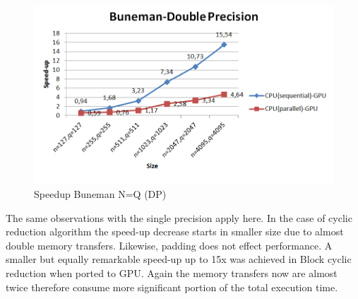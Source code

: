 \begin{figure}[H]
   \centering
       \includegraphics[width=1\textwidth]{grafhmata/buneman_dp_speedup_nq.png}
   \caption{Speedup Buneman N=Q (DP)}
   \label{fig:Speedup Buneman N=Q (DP)}
\end{figure}
The same observations with the single precision apply here. In the case of cyclic reduction algorithm the speed-up decrease starts in smaller size due to almost double memory transfers. Likewise, padding does not effect performance.
 A smaller but equally remarkable speed-up up to 15x was achieved in Block cyclic reduction when ported to GPU. Again the memory transfers now are almost twice therefore consume more significant portion of the total execution time.
